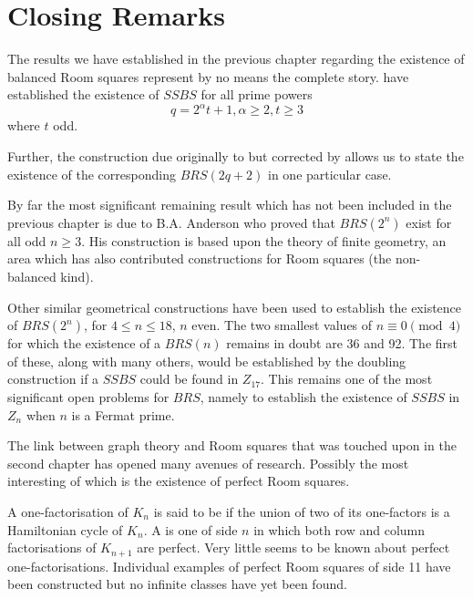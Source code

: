 \chapter{Closing Remarks}
\label{ch:closing-remarks}

The results we have established in the previous chapter regarding the existence of balanced Room squares represent by no means the complete story.
\cite{duExistenceSymmetricSkew1988} have established the existence of $SSBS$ for all prime powers
\begin{equation}
q = 2^{\alpha}t + 1, \alpha \geq 2, t \geq 3
\end{equation}
where $t$ odd.

Further, the construction due originally to
\cite{hwangCompleteBalancedHowell1984}
but corrected by
\cite{andersonConstructionBalancedRoom1999}
allows us to state the existence of the corresponding $BRS(2q + 2)$ in one particular case.

By far the most significant remaining result which has not been included in the previous chapter is due to B.A. Anderson who proved that $BRS(2^n)$ exist for all odd $n \geq 3$.
His construction is based upon the theory of finite geometry, an area which has also contributed constructions for Room squares (the non-balanced kind).

Other similar geometrical constructions have been used to establish the existence of $BRS(2^n)$, for $4 \leq n \leq 18$, $n$ even.
The two smallest values of $n \equiv 0 \pmod 4$ for which the existence of a $BRS(n)$ remains in doubt are 36 and 92.
The first of these, along with many others, would be established by the doubling construction if a $SSBS$ could be found in $Z_{17}$.
This remains one of the most significant open problems for $BRS$, namely to establish the existence of $SSBS$ in $Z_n$ when $n$ is a Fermat prime.

The link between graph theory and Room squares that was touched upon in the second chapter has opened many avenues of research.
Possibly the most interesting of which is the existence of perfect Room squares.

A one-factorisation of $K_n$ is said to be  if the union of two of its one-factors is a Hamiltonian cycle of $K_n$.
A  is one of side $n$ in which both row and column factorisations of $K_{n + 1}$ are perfect.
Very little seems to be known about perfect one-factorisations.
Individual examples of perfect Room squares of side 11 have been constructed but no infinite classes have yet been found.
